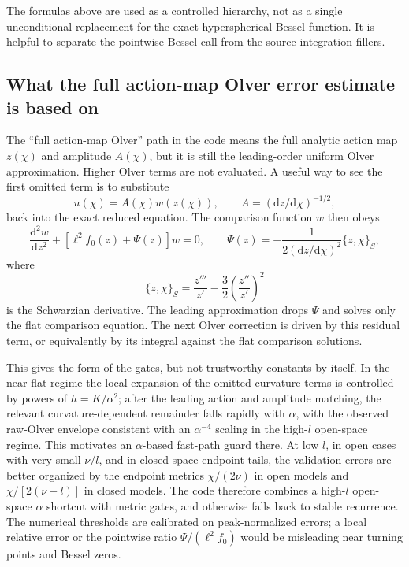 \documentclass[11pt,a4paper]{article}
\newcommand{\dd}{\mathrm{d}}
\begin{document}
The formulas above are used as a controlled hierarchy, not as a single
unconditional replacement for the exact hyperspherical Bessel function.  It is
helpful to separate the pointwise Bessel call from the source-integration
fillers.

\subsection{What the full action-map Olver error estimate is based on}

The ``full action-map Olver'' path in the code means the full analytic action
map \(z(\chi)\) and amplitude \(A(\chi)\), but it is still the leading-order
uniform Olver approximation.  Higher Olver terms are not evaluated.  A useful
way to see the first omitted term is to substitute
\[
  u(\chi)=A(\chi)w(z(\chi)),\qquad A=(\dd z/\dd\chi)^{-1/2},
\]
back into the exact reduced equation.  The comparison function \(w\) then obeys
\begin{equation}
  \frac{\dd^2 w}{\dd z^2}
  +\left[\ell^2 f_0(z)+\Psi(z)\right]w=0,
  \qquad
  \Psi(z)=
  -\frac{1}{2(\dd z/\dd\chi)^2}\{z,\chi\}_{S},
  \label{eq:olver-residual}
\end{equation}
where
\begin{equation}
  \{z,\chi\}_{S}
  =\frac{z'''}{z'}-\frac{3}{2}\left(\frac{z''}{z'}\right)^2
\end{equation}
is the Schwarzian derivative.  The leading approximation drops \(\Psi\) and
solves only the flat comparison equation.  The next Olver correction is driven
by this residual term, or equivalently by its integral against the flat
comparison solutions.

This gives the form of the gates, but not trustworthy constants by itself.  In
the near-flat regime the local expansion of the omitted curvature terms is
controlled by powers of \(h=K/\alpha^2\); after the leading action and amplitude
matching, the relevant curvature-dependent remainder falls rapidly with
\(\alpha\), with the observed raw-Olver envelope consistent with an
\(\alpha^{-4}\) scaling in the high-\(l\) open-space regime.  This motivates an
\(\alpha\)-based fast-path guard there.  At low \(l\), in open cases with very
small \(\nu/l\), and in closed-space endpoint tails, the validation errors are
better organized by the endpoint metrics \(\chi/(2\nu)\) in open models and
\(\chi/[2(\nu-l)]\) in closed models.  The code therefore combines a high-\(l\)
open-space \(\alpha\) shortcut with metric gates, and otherwise falls back to
stable recurrence.  The numerical thresholds are calibrated on peak-normalized
errors; a local relative error or the pointwise ratio \(\Psi/(\ell^2 f_0)\)
would be misleading near turning points and Bessel zeros.
\end{document}
